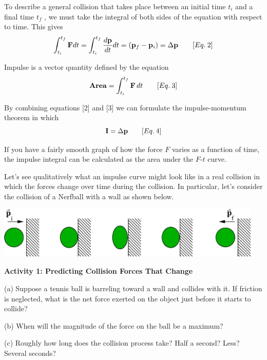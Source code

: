To describe a general collision that takes place between an initial time \( t_{i} \)
and a final time \( t_{f} \) , we must take the integral of both sides of the
equation with respect to time. This gives
\[
\int _{t_{i}}^{t_{f}}{\bf F}dt=\int _{t_{i}}^{t_{f}}\frac{d{\bf p}}{dt}dt=\left( {{\bf p}_{f}}-{{\bf p}_{i}}\right) =\Delta {\bf p}\qquad [Eq.\: 2]\]


Impulse is a vector quantity defined by the equation
\[
{\bf Area}=\int_{t_{i}}^{t_{f}}{\bf F}\,dt\qquad [Eq.\: 3]\]


By combining equations {[}2{]} and {[}3{]} we can formulate the impulse-momentum
theorem in which
\[
{\bf I}=\Delta {\bf p}\qquad [Eq.\: 4]\]


If you have a fairly smooth graph of how the force $F$ varies as a function
of time, the impulse integral can be calculated as the area under the $F$-$t$ 
curve.

Let's see qualitatively what an impulse curve might look like in a real collision
in which the forces change over time during the collision. In particular, let's
consider the collision of a Nerfball with a wall as shown below.

\vspace{0.3cm}
{\par\centering \includegraphics[width=5.0in]{impulseFor132/fig1.eps} \par}
\vspace{0.3cm}

\textbf{Activity  1: Predicting Collision Forces That Change }

(a) Suppose a tennis ball is barreling toward a wall and collides with it. 
If friction is neglected, what is the net force exerted on the object just before it starts to collide?
\vspace{10mm}

(b) When will the magnitude of the force on the ball be a maximum? 
\vspace{10mm}

(c) Roughly how long does the collision process take? Half a second? Less? Several
seconds?
\vspace{10mm}

